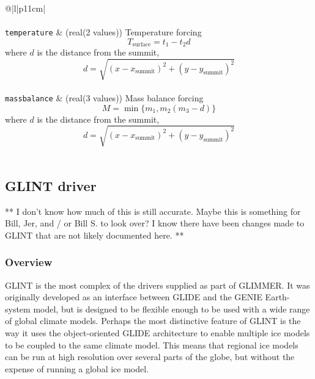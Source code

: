 \begin{center}
\begin{supertabular*}{\textwidth}{@{\extracolsep{\fill}}|l|p{11cm}|}
    \hline
    \\
    \hline
    \\
    \hline
    \texttt{temperature} & (real(2 values)) Temperature forcing $$T_{\mbox{surface}}=t_1-t_2d$$ where $d$ is the distance from the summit, $$d=\sqrt{(x-x_{\mbox{summit}})^2+(y-y_{\mbox{summit}})^2}$$\\
    \texttt{massbalance} & (real(3 values)) Mass balance forcing $$M=\min\{m_1,m_2(m_3-d)\}$$ where $d$ is the distance from the summit, $$d=\sqrt{(x-x_{\mbox{summit}})^2+(y-y_{\mbox{summit}})^2}$$\\
    \hline
  \end{supertabular*}
\end{center}

%


\subsection{GLINT driver}

** I don't know how much of this is still accurate. Maybe this is something for Bill, Jer, and / or Bill S. to look over? I know there have been changes made to GLINT that are not likely
documented here. **

\subsubsection{Overview}
%
GLINT is the most complex of the drivers supplied as part of GLIMMER. It was
originally developed as an interface between GLIDE and the GENIE Earth-system
model, but is designed to be flexible enough to be used with a wide range of
global climate models. Perhaps the most distinctive feature of GLINT is the
way it uses the object-oriented GLIDE architecture to enable multiple ice
models to be coupled to the same climate model. This means that regional ice
models can be run at high resolution over several parts of the globe, but
without the expense of running a global ice model.

